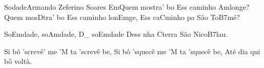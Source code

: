 \begin{musica}{Sodade}{Armando Zeferino Soares}{}
\ac{Em}{Quem} mostra' bo
Ess caminho \ac{Am}{lon}ge?
Quem mos\ac{D}{tra}' bo
Ess caminho lon\ac{Em}{ge},
Ess ca\ac{C}{mi}nho pa São To\ac{B7}{mé}?

So\ac{Em}{da}de, so\ac{Am}{da}de, \ac{D}{}_ so\ac{Em}{da}de
Dess nha \ac{C}{te}rra São Nico\ac{B7}{lau}.

Si bô 'screvê' me
'M ta 'screvê be,
Si bô 'squecê me
'M ta 'squecê be,
Até dia qui bô voltà.


\end{musica}
